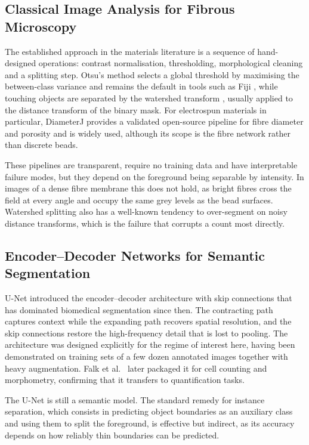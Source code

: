 \subsection{Classical Image Analysis for Fibrous Microscopy}

The established approach in the materials literature is a sequence of
hand-designed operations: contrast normalisation, thresholding, morphological
cleaning and a splitting step. Otsu's method \cite{otsu1979threshold} selects a
global threshold by maximising the between-class variance and remains the default
in tools such as Fiji \cite{schindelin2012fiji}, while touching objects are
separated by the watershed transform \cite{vincent1991watersheds}, usually applied
to the distance transform of the binary mask. For electrospun materials in
particular, DiameterJ \cite{hotaling2015diameterj} provides a validated
open-source pipeline for fibre diameter and porosity and is widely used, although
its scope is the fibre network rather than discrete beads.

These pipelines are transparent, require no training data and have interpretable
failure modes, but they depend on the foreground being separable by intensity. In
images of a dense fibre membrane this does not hold, as bright fibres cross the
field at every angle and occupy the same grey levels as the bead surfaces.
Watershed splitting also has a well-known tendency to over-segment on noisy
distance transforms, which is the failure that corrupts a count most directly.

\subsection{Encoder--Decoder Networks for Semantic Segmentation}

U-Net \cite{ronneberger2015unet} introduced the encoder--decoder architecture with
skip connections that has dominated biomedical segmentation since then. The
contracting path captures context while the expanding path recovers spatial
resolution, and the skip connections restore the high-frequency detail that is lost
to pooling. The architecture was designed explicitly for the regime of interest
here, having been demonstrated on training sets of a few dozen annotated images
together with heavy augmentation. Falk et al.\ \cite{falk2019unet} later packaged
it for cell counting and morphometry, confirming that it transfers to
quantification tasks.

The U-Net is still a semantic model. The standard remedy for instance
separation, which consists in predicting object boundaries as an auxiliary class and
using them to split the foreground, is effective but indirect, as its accuracy
depends on how reliably thin boundaries can be predicted.

